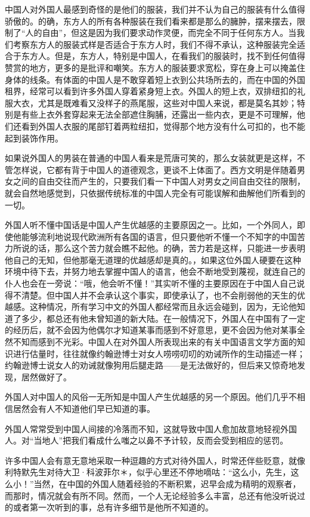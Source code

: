 \documentclass[12pt,oneside]{book}
\begin{document}
\begin{common-format}
中国人对外国人最感到奇怪的是他们的服装，我们并不认为自己的服装有什么值得骄傲的。的确，东方人的所有各种服装在我们看来都是那么的臃肿，摆来摆去，限制了“人的自由”，但这是因为我们要求动作灵便，而完全不同于任何东方人。当我们考察东方人的服装式样是否适合于东方人时，我们不得不承认，这种服装完全适合于东方人。但是，东方人，特别是中国人，在看我们的服装时，找不到任何值得赞赏的地方，更多的是批评和嘲笑。东方人的服装要求宽松，穿在身上可以掩盖住身体的线条。有体面的中国人是不敢穿着短上衣到公共场所去的，而在中国的外国租界，经常可以看到许多外国人穿着紧身短上衣。外国人的短上衣，双排纽扣的礼服大衣，尤其是既难看又没样子的燕尾服，这些对中国人来说，都是莫名其妙；特别是有些上衣外套穿起来无法全部遮住胸脯，还露出一些内衣，更是不可理解，他们还看到外国人衣服的尾部钉着两粒纽扣，觉得那个地方没有什么可扣的，也不能起到装饰作用。 

如果说外国人的男装在普通的中国人看来是荒唐可笑的，那么女装就更是这样，不管怎样说，它都有背于中国人的道德观念，更谈不上体面了。西方文明是伴随着男女之间的自由交往而产生的，只要我们看一下中国人对男女之间自由交往的限制，就会自然地感觉到，只依据传统标准的中国人完全有可能误解和曲解他们所看到的一切。 

外国人听不懂中国话是中国人产生优越感的主要原因之一。比如，一个外同人，即使他能够流利地说现代欧洲所有各国的语言，但只要他听不懂一个不知字的中国苦力所说的话，那么这个苦力就会瞧不起他。的确，苦力若是这样，只能进一步表明他自己的无知，但他那毫无道理的优越感却是真的。，如果这位外国人硬要在这种环境中待下去，并努力地去掌握中国人的语言，他会不断地受到蔑视，就连自己的仆人也会在一旁说：“哦，他会听不懂！”其实听不懂的主要原因在于中国人自己说得不清楚。但中国人并不会承认这个事实，即使承认了，也不会削弱他的天生的优越感。这种情况，所有学习中文的外国人都经常而且永远会碰到，因为，无论他知道了多少，都总还有他未曾知道的新大陆。在一般情况下，外国人在中国有了一定的经历后，就不会因为他偶尔才知道某事而感到不好意思，更不会因为他对某事全然不知而感到不光彩。中国人在对外国人所表现出来的有关中国语言文学方面的知识进行估量时，往往就像约翰逊博士对女人唠唠叨叨的劝诫所作的生动描述一样；约翰逊博士说女人的劝诫就像狗用后腿走路——是无法做好的，但后来又惊奇地发现，居然做好了。 

外国人对中国人的风俗一无所知是中国人产生优越感的另一个原因。他们几乎不相信居然会有人不知道他们早已知道的事。 

外国人常常受到中国人间接的冷落而不知，这就导致中国人愈加故意地轻视外国人。对“当地人”把我们看成什么嗤之以鼻不予计较，反而会受到相应的惩罚。 

许多中国人会有意无意地采取一种逗趣的方式对待外国人，时常还伴些贬意，就像利特默先生对待大卫·科波菲尔＊，似乎心里还不停地嘀咕：“这么小，先生，这么小！”当然，在中国的外国人随着经验的不断积累，迟早会成为精明的观察者，而那时，情况就会有所不同。然而，一个人无论经验多么丰富，总还有他没听说过的或者第一次听到的事，总有许多细节是他所不知道的。 


\end{common-format}
\end{document}
